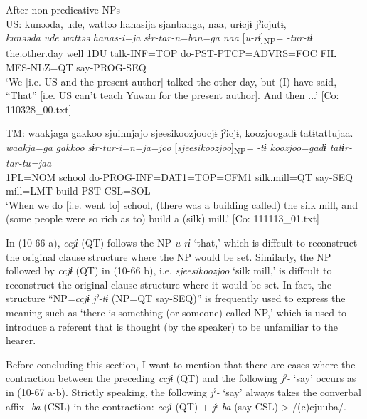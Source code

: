 \ea\label{ex:10.66}   After non-predicative NPs\\
  \ea  US: \glll kunəəda,  ude,  wattəə  hanasija  sjanbanga,   naa,  urɨcjɨ  jˀicjutɨ,\\
      \textit{kunəəda}  \textit{ude}  \textit{wattəə}  \textit{hanas-i=ja}  \textit{sɨr-tar-n=ban=ga}  \textit{naa}  [\textit{u-rɨ}]\textsubscript{NP}\textit{=}  \textit{-tur-tɨ}\\
      the.other.day  well  1DU  talk-INF=TOP  do-PST-PTCP=ADVRS=FOC  FIL  MES-NLZ=QT  say-PROG-SEQ\\
      \glt       ‘We [i.e. US and the present author] talked the other day, but (I) have said, “That” [i.e. US can’t teach Yuwan for the present author]. And then ...’ [Co: 110328\_00.txt]

  \ex  TM:     \glll    waakjaga  {\textbar}gakkoo{\textbar}  sjuinnjajo  {\textbar}sjeesikoozjoo{\textbar}cjɨ    jˀicjɨ,  {\textbar}koozjoo{\textbar}gadɨ  tatɨtattujaa.\\
      \textit{waakja=ga}  \textit{gakkoo}  \textit{sɨr-tur-i=n=ja=joo}  [\textit{sjeesikoozjoo}]\textsubscript{NP}\textit{=}  \textit{-tɨ  koozjoo=gadɨ  tatɨr-tar-tu=jaa}\\
      1PL=NOM  school  do{}-PROG-INF=DAT1=TOP=CFM1  silk.mill=QT say-SEQ  mill=LMT  build-PST-CSL=SOL\\
      \glt       ‘When we do [i.e. went to] school, (there was a building called) the silk mill, and (some people were so rich as to) build a (silk) mill.’ [Co: 111113\_01.txt]
    \z
\z

In (10-66 a), \textit{ccjɨ} (QT) follows the NP \textit{u-rɨ} ‘that,’ which is diffcult to reconstruct the original clause structure where the NP would be set. Similarly, the NP followed by \textit{ccjɨ} (QT) in (10-66 b), i.e. \textit{sjeesikoozjoo} ‘silk mill,’ is diffcult to reconstruct the original clause structure where it would be set. In fact, the structure “NP\textit{=ccjɨ} \textit{jˀ-tɨ} (NP=QT say-SEQ)” is frequently used to express the meaning such as ‘there is something (or someone) called NP,’ which is used to introduce a referent that is thought (by the speaker) to be unfamiliar to the hearer.

  Before concluding this section, I want to mention that there are cases where the contraction between the preceding \textit{ccjɨ} (QT) and the following \textit{jˀ-} ‘say’ occurs as in (10-67 a-b). Strictly speaking, the following \textit{jˀ-} ‘say’ always takes the converbal affix \textit{{}-ba} (CSL) in the contraction: \textit{ccjɨ} (QT) + \textit{jˀ-ba} (say-CSL) > /(c)cjuuba/.

